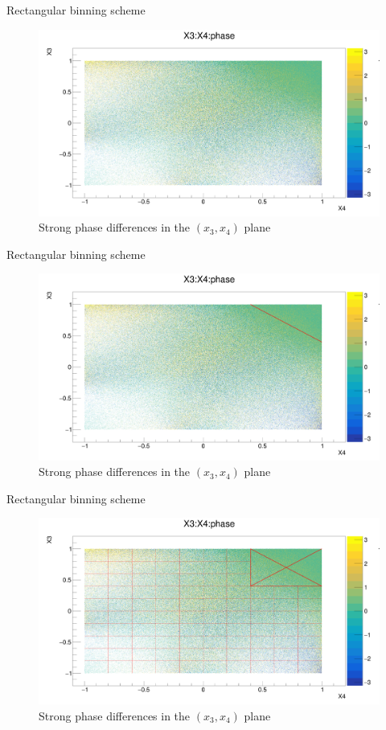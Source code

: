 \documentclass{beamer}
\begin{document}
\begin{frame}{Rectangular binning scheme}
  \begin{figure}
    \centering
    \includegraphics[width = 1.0\textwidth]{X3X4Phase.png}
    \caption{Strong phase differences in the $(x_3, x_4)$ plane}
  \end{figure}
\end{frame}

\begin{frame}{Rectangular binning scheme}
  \begin{figure}
    \centering
    \includegraphics[width = 1.0\textwidth]{X3X4PhaseRegion1.png}
    \caption{Strong phase differences in the $(x_3, x_4)$ plane}
  \end{figure}
\end{frame}

\begin{frame}{Rectangular binning scheme}
  \begin{figure}
    \centering
    \includegraphics[width = 1.0\textwidth]{X3X4PhaseRegions.png}
    \caption{Strong phase differences in the $(x_3, x_4)$ plane}
  \end{figure}
\end{frame}
\end{document}
